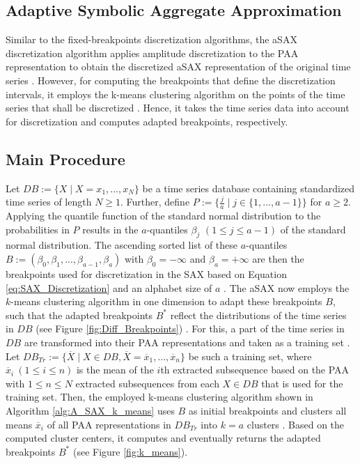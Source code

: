 \subsection{Adaptive Symbolic Aggregate Approximation}
Similar to the fixed-breakpoints discretization algorithms, the \ac{aSAX} discretization algorithm applies amplitude discretization to the \ac{PAA} representation to obtain the discretized \ac{aSAX} representation of the original time series \cite{A_SAX}. However, for computing the breakpoints that define the discretization intervals, it employs the k-means clustering algorithm on the points of the time series that shall be discretized \cite{A_SAX}. Hence, it takes the time series data into account for discretization and computes adapted breakpoints, respectively.
\subsection*{Main Procedure}
Let $DB := \{X \mid X = x_1, ..., x_N \}$ be a time series database containing standardized time series of length $N \geq 1$. Further, define $P := \{\frac{j}{a} \mid j \in \{1, ..., a-1\}\}$ for $a \geq 2$. Applying the quantile function of the standard normal distribution to the probabilities in $P$ results in the $a$-quantiles $\beta_j$ $(1 \leq j \leq a-1)$ of the standard normal distribution. The ascending sorted list of these $a$-quantiles $B := (\beta_0, \beta_1, ..., \beta_{a-1}, \beta_a)$ with $\beta_0 = -\infty$ and $\beta_a = +\infty$ are then the breakpoints used for discretization in the \ac{SAX} based on Equation \ref{eq:SAX_Discretization} and an alphabet size of $a$ \cite{SAX_Lin_first}. \newline
The \ac{aSAX} now employs the $k$-means clustering algorithm in one dimension to adapt these breakpoints $B$, such that the adapted breakpoints $B^*$ reflect the distributions of the time series in $DB$ (see Figure \ref{fig:Diff_Breakpoints}) \cite{A_SAX}. For this, a part of the time series in $DB$ are transformed into their \ac{PAA} representations and taken as a training set \cite{A_SAX}. Let $DB_{Tr} := \{\overline{X} \mid X \in DB, \overline{X} = \overline{x}_1, ..., \overline{x}_n \}$ be such a training set, where $\overline{x}_i \ (1 \leq i \leq n)$ is the mean of the $i$th extracted subsequence based on the \ac{PAA} with $1 \leq n \leq N$ extracted subsequences from each $X \in DB$ that is used for the training set. Then, the employed k-means clustering algorithm shown in Algorithm \ref{alg:A_SAX_k_means} uses $B$ as initial breakpoints and clusters all means $\overline{x}_i$ of all \ac{PAA} representations in $DB_{Tr}$ into $k = a$ clusters \cite{A_SAX}. Based on the computed cluster centers, it computes and eventually returns the adapted breakpoints $B^*$ (see Figure \ref{fig:k_means}). \newline
